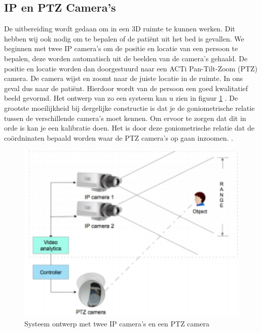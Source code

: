 \subsection{IP en PTZ Camera's}
\label{refIPC2}
De uitbereiding wordt gedaan om in een 3D ruimte te kunnen werken. Dit hebben wij ook nodig om te bepalen of de pati\"ent uit het bed is gevallen. We beginnen met twee IP camera's om de positie en locatie van een persoon te bepalen, deze worden automatisch uit de beelden van de camera's gehaald. De positie en locatie worden dan doorgestuurd naar een ACTi Pan-Tilt-Zoom (PTZ) camera. De camera wijst en zoomt naar de juiste locatie in de ruimte. In ons geval dus naar de pati\"ent. Hierdoor wordt van de persoon een goed kwalitatief beeld gevormd. Het ontwerp van zo een systeem kan u zien in figuur \ref{imgIPC2} \cite{bibIPC}. De grootste moeilijkheid bij dergelijke constructie is dat je de goniometrische relatie tussen de verschillende camera's moet kennen. Om ervoor te zorgen dat dit in orde is kan je een kalibratie doen. Het is door deze goniometrische relatie dat de co\"ordninaten bepaald worden waar de PTZ camera's op gaan inzoomen.  \cite{bibVTC3}.

\begin{figure}[hbp]
	\includegraphics[scale=0.5]{IPPTZCamera}
	\caption{Systeem ontwerp met twee IP camera's en een PTZ camera}
	\label{imgIPC2}
\end{figure}


